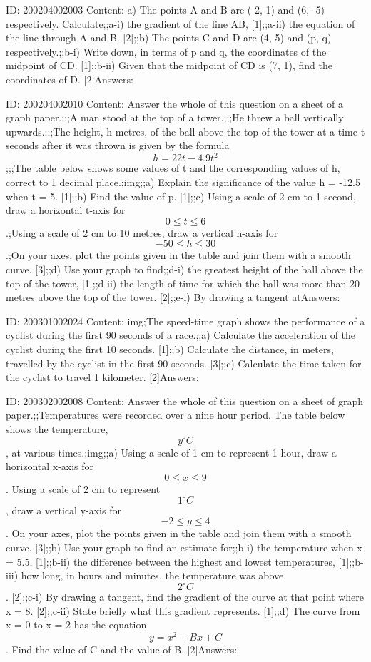 \documentclass{article}
\begin{document}
ID: 200204002003
Content:
a) The points A and B are (-2, 1) and (6, -5) respectively. Calculate;;a-i) the gradient of the line AB,   [1];;a-ii) the equation of the line through A and B.   [2];;b) The points C and D are (4, 5) and (p, q) respectively.;;b-i) Write down, in terms of p and q, the coordinates of the midpoint of CD.   [1];;b-ii) Given that the midpoint of CD is (7, 1), find the coordinates of D.   [2]Answers:

ID: 200204002010
Content:
Answer the whole of this question on a sheet of a graph paper.;;;A man stood at the top of a tower.;;;He threw a ball vertically upwards.;;;The height, h metres, of the ball above the top of the tower at a time t seconds after it was thrown is given by the formula $$h = 22t - 4.9t^2$$;;;The table below shows some values of t and the corresponding values of h, correct to 1 decimal place.;img;;a) Explain the significance of the value h = -12.5 when t = 5.   [1];;b) Find the value of p.   [1];;c) Using a scale of 2 cm to 1 second, draw a horizontal t-axis for $$0 \leq t \leq 6$$.;Using a scale of 2 cm to 10 metres, draw a vertical h-axis for $$-50 \leq h \leq 30$$.;On your axes, plot the points given in the table and join them with a smooth curve.   [3];;d) Use your graph to find;;d-i) the greatest height of the ball above the top of the tower,   [1];;d-ii) the length of time for which the ball was more than 20 metres above the top of the tower.   [2];;e-i) By drawing a tangent atAnswers:

ID: 200301002024
Content:
img;The speed-time graph shows the performance of a cyclist during the first 90 seconds of a race.;;a) Calculate the acceleration of the cyclist during the first 10 seconds. [1];;b) Calculate the distance, in meters, travelled by the cyclist in the first 90 seconds. [3];;c) Calculate the time taken for the cyclist to travel 1 kilometer. [2]Answers:

ID: 200302002008
Content:
Answer the whole of this question on a sheet of graph paper.;;Temperatures were recorded over a nine hour period. The table below shows the temperature, $$y ^{\circ}C$$, at various times.;img;;a) Using a scale of 1 cm to represent 1 hour, draw a horizontal x-axis for $$0\leq x\leq 9$$. Using a scale of 2 cm to represent $$1^{\circ}C$$, draw a vertical y-axis for $$-2\leq y\leq 4$$. On your axes, plot the points given in the table and join them with a smooth curve. [3];;b) Use your graph to find an estimate for;;b-i) the temperature when x = 5.5, [1];;b-ii) the difference between the highest and lowest temperatures, [1];;b-iii) how long, in hours and minutes, the temperature was above $$2^{\circ}C$$. [2];;c-i) By drawing a tangent, find the gradient of the curve at that point where x = 8. [2];;c-ii) State briefly what this gradient represents. [1];;d) The curve from x = 0 to x = 2 has the equation $$y=x^{2} +Bx+C$$. Find the value of C and the value of B. [2]Answers:
\end{document}
